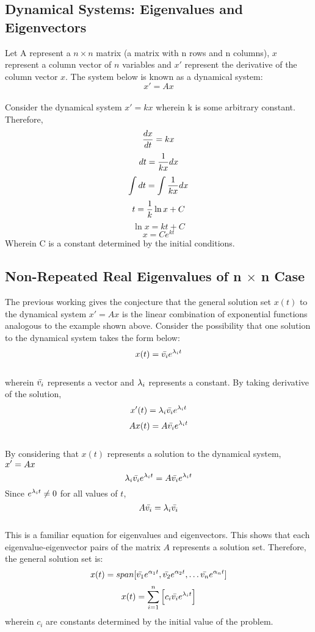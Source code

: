 \documentclass[class=report, 12pt, crop=false]{standalone}
\begin{document}
\begin{center}
\chapter{Dynamical Systems: Eigenvalues and Eigenvectors}
\begin{comment}
\end{comment}
Let A represent a $n \times n$ matrix (a matrix with n rows and n columns), $x$ represent a column vector of $n$ variables and $x'$ represent the derivative of the column vector $x$. The system below is known as a dynamical system:
$$x' = Ax$$
\\Consider the dynamical system $x' = kx$ wherein k is some arbitrary constant. Therefore,
$$\frac{dx}{dt} = kx$$
$$dt = \frac{1}{kx}dx$$
$$\int dt = \int \frac{1}{kx}dx$$
$$t = \frac{1}{k}\ln{x}+ C$$
$$\ln{x} = kt + C$$
$$x = Ce^{kt}$$
Wherein C is a constant determined by the initial conditions.
\section{Non-Repeated Real Eigenvalues of n $\times$ n Case}
\begin{comment}
\end{comment}
The previous working gives the conjecture that the general solution set $x(t)$ to the dynamical system $x' = Ax$ is the linear combination of exponential functions analogous to the example shown above. Consider the possibility that one solution to the dynamical system takes the form below:
$$x(t) = \bar{v_i}e^{\lambda_i t}$$
\\wherein $\bar{v_i}$ represents a vector and $\lambda_i$ represents a constant. By taking derivative of the solution, 
$$x'(t) = \lambda_i\bar{v_i}e^{\lambda_i t}$$
$$Ax(t) = A\bar{v_i}e^{\lambda_i t}$$
\\By considering that $x(t)$ represents a solution to the dynamical system, $\displaystyle{x' = Ax}$
$$\lambda_i\bar{v_i}e^{\lambda_i t} = A\bar{v_i}e^{\lambda_i t}$$
Since $e^{\lambda_i t} \neq 0$ for all values of $t$,
$$A\bar{v_i} = \lambda_i\bar{v_i}$$
\\This is a familiar equation for eigenvalues and eigenvectors. This shows that each eigenvalue-eigenvector pairs of the matrix $A$ represents a solution set. Therefore, the general solution set is:
$$x(t) = span[\bar{v_1}e^{\alpha_1 t}, \bar{v_2}e^{\alpha_2 t}, \dots \bar{v_n}e^{\alpha_n t}]$$
$$x(t) = \sum_{i = 1}^{n} \left[c_i\bar{v_i}e^{\lambda_i t}\right]$$
wherein $c_i$ are constants determined by the initial value of the problem. 

\end{center}
\end{document}
